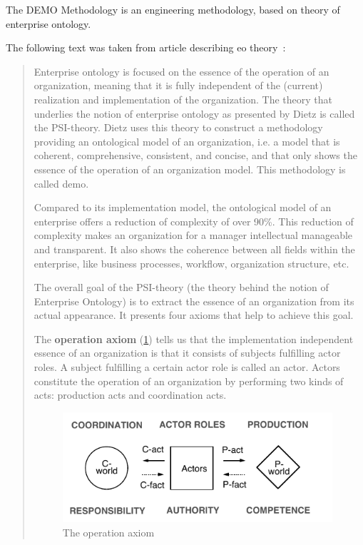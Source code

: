 The DEMO Methodology\cite{dietz-enterprise-2006} is an engineering methodology, based on theory of enterprise ontology.

The following text was taken from article describing \gls{eo} theory~\cite{haan-modeling-2009}:

\begin{quotation}
Enterprise ontology is focused on the essence of the operation of an organization, meaning that it is fully independent of the (current) realization and implementation of the organization. The theory that underlies the notion of enterprise ontology as presented by Dietz is called the PSI-theory. Dietz uses this theory to construct a methodology providing an ontological model of an organization, i.e. a model that is coherent, comprehensive, consistent, and concise, and that only shows the essence of the operation of an organization model. This methodology is called \gls{demo}.

Compared to its implementation model, the ontological model of an enterprise offers a reduction of complexity of over 90\%. This reduction of complexity makes an organization for a manager intellectual manageable and transparent. It also shows the coherence between all fields within the enterprise, like business processes, workflow, organization structure, etc.

The overall goal of the PSI-theory (the theory behind the notion of Enterprise Ontology) is to extract the essence of an organization from its actual appearance. It presents four axioms that help to achieve this goal.

The \textbf{operation axiom} (\cref{fig:OperationAxiom}) tells us that the implementation independent essence of an organization is that it consists of subjects fulfilling actor roles. A subject fulfilling a certain actor role is called an actor. Actors constitute the operation of an organization by performing two kinds of acts: production acts and coordination acts.

\begin{figure}[ht!]
	\centering
    \includegraphics[width=10cm, keepaspectratio]{img/OperationAxiom}
    \caption{The operation axiom}
    \label{fig:OperationAxiom}
\end{figure}


\end{quotation}
